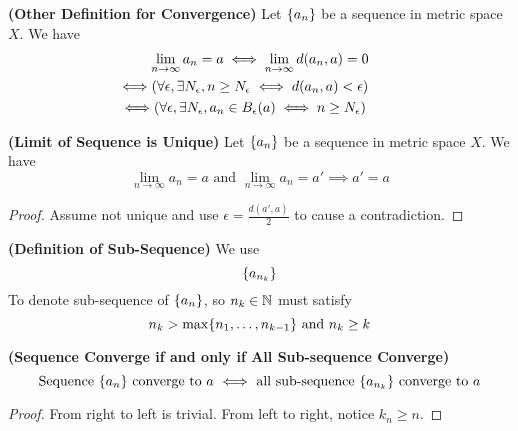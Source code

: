 \documentclass{report}
\begin{document}
\begin{theorem}
\label{1.1.5}
\textbf{(Other Definition for Convergence)} Let $\{ a_n \}$ be a sequence in metric space $X$. We have
 \begin{gather}
\lim_{n\to \infty}a_n=a\iff \lim_{n\to\infty}d(a_n,a)=0\\
\liff (\forall \epsilon ,\exists N_\epsilon, n\geq N_\epsilon \iff  d(a_n,a)<\epsilon) \\
\liff (\forall \epsilon, \exists N_\epsilon , a_n\in B_\epsilon (a)\iff  n\geq N_\epsilon )
\end{gather}
\end{theorem}
\begin{theorem}
\label{1.1.6}
\textbf{(Limit of Sequence is Unique)} Let $\{ a_n \}$ be a sequence in metric space $X$. We have
 \begin{equation}
\lim_{n\to\infty}a_n=a\text{ and }\lim_{n\to\infty}a_n=a'\implies a'=a
\end{equation}
\end{theorem}
\begin{proof}
Assume not unique and use $\epsilon=\frac{d(a',a)}{2}$ to cause a contradiction.
\end{proof}
\begin{definition}
\label{1.1.7}
\textbf{(Definition of Sub-Sequence)} We use
\begin{equation}
\{ a_{n_k} \}
\end{equation}
To denote sub-sequence of $\{ a_n \}$, so $n_k\in\mathbb{N}$ must satisfy
 \begin{equation}
n_k> \max \{ n_1,\dots, n_{k-1} \}\text{ and }n_k\geq k 
\end{equation}
\end{definition}
\begin{theorem}
\label{1.1.8}
\textbf{(Sequence Converge if and only if All Sub-sequence Converge)} 
\begin{equation}
\text{ Sequence $\{ a_n \}$ converge to $a$ $\iff $ all sub-sequence $\{ a_{n_k} \}$ converge to $a$ }
\end{equation}
\end{theorem}
\begin{proof}
From right to left is trivial. From left to right, notice $k_n\geq n$. 
\end{proof}
\end{document}
